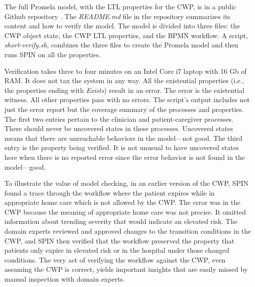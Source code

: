 The full Promela model, with the LTL properties for the CWP, is in a public Github repository \cite{repo}. The \emph{README.md} file in the repository summarizes its content and how to verify the model. The model is divided into three files: the CWP object state, the CWP LTL properties, and the BPMN workflow. A script, \emph{short-verify.sh}, combines the three files to create the Promela model and then runs SPIN on all the properties.

\begin{comment}
\begin{figure*}[t]
  \begin{center}
    \begin{tabular}{c}
      \texttt{[image: ../figs/proof-digest.png]}
    \end{tabular}
  \end{center}
\caption{Some of the verification results from the SPIN model checker.}
\label{fig:proof}
\end{figure*}
The results for the state properties for \texttt{ptInElevatedRiskHomeCare} with the measured time verifying the entire model is shown in \figref{fig:proof}.
\end{comment}

Verification takes three to four minutes on an Intel Core i7 laptop with 16 Gb of RAM. It does not tax the system in any way.
All the existential properties (i.e., the properties ending with \emph{Exists}) result in an error. The error is the existential witness.
All other properties pass with no errors. The script's output includes not just the error report but the coverage summary of the processes and properties.
The first two entries pertain to the clinician and patient-caregiver processes. There should never be uncovered states in these processes.
Uncovered states means that there are unreachable behaviors in the model---not good. The third entry is the property being verified.
It is not unusual to have uncovered states here when there is no reported error since the error behavior is not found in the model---good.

To illustrate the value of model checking, in an earlier version of the CWP, SPIN found a trace through the workflow where the patient expires while in appropriate home care which is not allowed by the CWP. The error was in the CWP because the meaning of appropriate home care was not precise. It omitted information about trending severity that would indicate an elevated risk. The domain experts reviewed and approved changes to the transition conditions in the CWP, and SPIN then verified that the workflow preserved the property that patients only expire in elevated risk or in the hospital under those changed conditions. The very act of verifying the workflow against the CWP, even assuming the CWP is correct, yields important insights that are easily missed by manual inspection with domain experts.